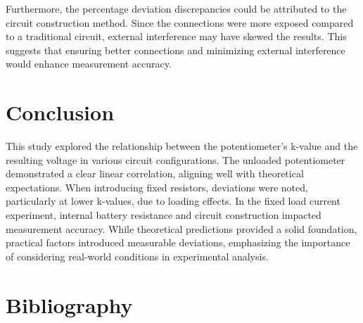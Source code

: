 \documentclass[a4paper]{article}
\begin{document}
Furthermore, the percentage deviation discrepancies could be attributed to the circuit construction method. 
Since the connections were more exposed compared to a traditional circuit, 
external interference may have skewed the results. 
This suggests that ensuring better connections and minimizing external interference would enhance measurement accuracy.


\section{Conclusion}
This study explored the relationship between the potentiometer's k-value and the resulting voltage in various circuit configurations. 
The unloaded potentiometer demonstrated a clear linear correlation, aligning well with theoretical expectations.
When introducing fixed resistors, deviations were noted, particularly at lower k-values, due to loading effects. 
In the fixed load current experiment, internal battery resistance and circuit construction impacted measurement accuracy. 
While theoretical predictions provided a solid foundation, practical factors introduced measurable deviations, 
emphasizing the importance of considering real-world conditions in experimental analysis.
\renewcommand{\refname}{}
\section{Bibliography}


\end{document}
